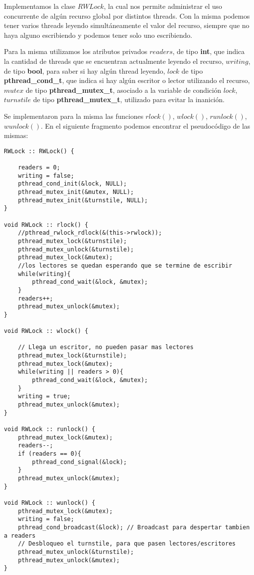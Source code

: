 Implementamos la clase $RWLock$, la cual nos permite administrar el uso concurrente de algún recurso global por distintos threads. Con la misma podemos tener varios threads leyendo simultáneamente el valor del recurso, siempre que no haya alguno escribiendo y podemos tener solo uno escribiendo.

Para la misma utilizamos los atributos privados $ readers $, de tipo \textbf{int}, que indica la cantidad de threads que se encuentran actualmente leyendo el recurso, $ writing $, de tipo \textbf{bool}, para saber si hay algún thread leyendo, $ lock $ de tipo \textbf{pthread_cond_t}, que indica si hay algún escritor o lector utilizando el recurso, $ mutex $ de tipo \textbf{pthread_mutex_t}, asociado a la variable de condición $ lock $, $ turnstile $ de tipo \textbf{pthread_mutex_t}, utilizado para evitar la inanición. 

Se implementaron para la misma las funciones $ rlock() $, $ wlock() $, $ runlock() $, $ wunlock() $. En el siguiente fragmento podemos encontrar el pseudocódigo de las mismas:

\begin{lstlisting}
RWLock :: RWLock() {

    readers = 0;
    writing = false;
    pthread_cond_init(&lock, NULL);
    pthread_mutex_init(&mutex, NULL);
    pthread_mutex_init(&turnstile, NULL);
}

void RWLock :: rlock() {
    //pthread_rwlock_rdlock(&(this->rwlock));
    pthread_mutex_lock(&turnstile);
    pthread_mutex_unlock(&turnstile);
    pthread_mutex_lock(&mutex);
    //los lectores se quedan esperando que se termine de escribir
    while(writing){
        pthread_cond_wait(&lock, &mutex);
    }
    readers++;
    pthread_mutex_unlock(&mutex);
}

void RWLock :: wlock() {

    // Llega un escritor, no pueden pasar mas lectores
    pthread_mutex_lock(&turnstile);
    pthread_mutex_lock(&mutex);
    while(writing || readers > 0){
        pthread_cond_wait(&lock, &mutex);
    }
    writing = true;
    pthread_mutex_unlock(&mutex);
}

void RWLock :: runlock() {
    pthread_mutex_lock(&mutex);
    readers--;
    if (readers == 0){
        pthread_cond_signal(&lock);
    }
    pthread_mutex_unlock(&mutex);
}

void RWLock :: wunlock() {
    pthread_mutex_lock(&mutex);
    writing = false;
    pthread_cond_broadcast(&lock); // Broadcast para despertar tambien a readers
    // Desbloqueo el turnstile, para que pasen lectores/escritores
    pthread_mutex_unlock(&turnstile);
    pthread_mutex_unlock(&mutex);
}
\end{lstlisting}


